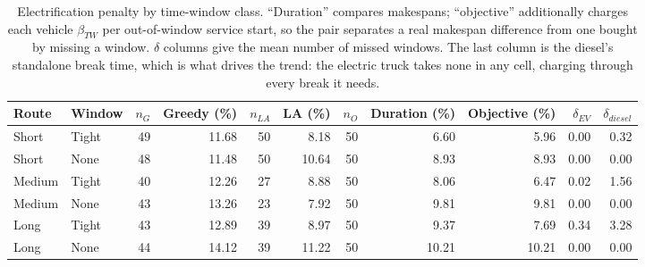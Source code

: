 \begin{table}[ht]\centering
\caption{Electrification penalty by time-window class.  ``Duration'' compares makespans; ``objective'' additionally charges each vehicle $\beta_{TW}$ per out-of-window service start, so the pair separates a real makespan difference from one bought by missing a window.  $\delta$ columns give the mean number of missed windows.  The last column is the diesel's standalone break time, which is what drives the trend: the electric truck takes none in any cell, charging through every break it needs.}
\label{tab:diesel-tw}
\begin{tabular}{llrrrrrrrrr}
\hline
Route & Window & $n_G$ & Greedy (\%) & $n_{LA}$ & LA (\%) & $n_O$ & Duration (\%) & Objective (\%) & $\delta_{EV}$ & $\delta_{diesel}$ \\
\hline
Short & Tight & 49 & 11.68 & 50 & 8.18 & 50 & 6.60 & 5.96 & 0.00 & 0.32 \\
Short & None & 48 & 11.48 & 50 & 10.64 & 50 & 8.93 & 8.93 & 0.00 & 0.00 \\
Medium & Tight & 40 & 12.26 & 27 & 8.88 & 50 & 8.06 & 6.47 & 0.02 & 1.56 \\
Medium & None & 43 & 13.26 & 23 & 7.92 & 50 & 9.81 & 9.81 & 0.00 & 0.00 \\
Long & Tight & 43 & 12.89 & 39 & 8.97 & 50 & 9.37 & 7.69 & 0.34 & 3.28 \\
Long & None & 44 & 14.12 & 39 & 11.22 & 50 & 10.21 & 10.21 & 0.00 & 0.00 \\
\hline
\end{tabular}
\end{table}
